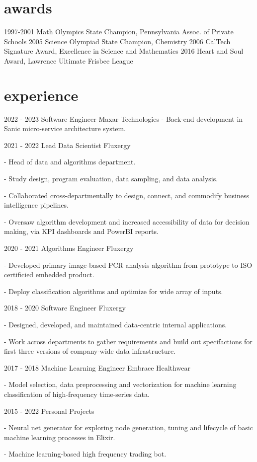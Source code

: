 \documentclass[]{twentysecondcv}
\begin{document}

\section{awards}

\begin{twentyshort}
  \twentyitemshort
    {1997-2001}
    {Math Olympics State Champion, Pennsylvania Assoc. of Private Schools}
  \twentyitemshort
    {2005}
    {Science Olympiad State Champion, Chemistry}
  \twentyitemshort
    {2006}
    {CalTech Signature Award, Excellence in Science and Mathematics}
  \twentyitemshort
    {2016}
    {Heart and Soul Award, Lawrence Ultimate Frisbee League}
\end{twentyshort}


\section{experience}

\begin{twenty}
  \twentyitem
    {2022 - 2023}
    {Software Engineer}
    {Maxar Technologies}
    {- Back-end development in Sanic micro-service architecture system. 
}

  \twentyitem
    {2021 - 2022}
    {Lead Data Scientist}
    {Fluxergy}
    {- Head of data and algorithms department.

	- Study design, program evaluation, data sampling, and data analysis.

	- Collaborated cross-departmentally to design, connect, and commodify business intelligence pipelines.

	- Oversaw algorithm development and increased accessibility of data for decision making, via KPI dashboards and PowerBI reports.
	} 
  \twentyitem
    {2020 - 2021}
    {Algorithms Engineer}
    {Fluxergy}
    {- Developed primary image-based PCR analysis algorithm from prototype to ISO certificied embedded product.

	- Deploy classification algorithms and optimize for wide array of inputs.

	} 
  \twentyitem
    {2018 - 2020}
    {Software Engineer}
    {Fluxergy}
    {- Designed, developed, and maintained data-centric internal applications.

	- Work across departments to gather requirements and build out specifactions for first three versions of company-wide data infrastructure.
	} 
  \twentyitem
    {2017 - 2018}
    {Machine Learning Engineer}
    {Embrace Healthwear}
    {- Model selection, data preprocessing and vectorization for machine learning classification of high-frequency time-series data.

	} 
  \twentyitem
    {2015 - 2022}
    {Personal Projects}
    {}
    {- Neural net generator for exploring node generation, tuning and lifecycle of basic machine learning processes in Elixir.

	- Machine learning-based high frequency trading bot.} 
\end{twenty}
\end{document}
